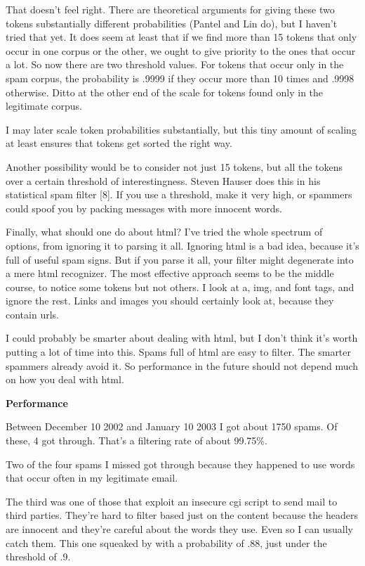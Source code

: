 That doesn't feel right. There are theoretical arguments for giving
these two tokens substantially different probabilities (Pantel and Lin
do), but I haven't tried that yet. It does seem at least that if we find
more than 15 tokens that only occur in one corpus or the other, we ought
to give priority to the ones that occur a lot. So now there are two
threshold values. For tokens that occur only in the spam corpus, the
probability is .9999 if they occur more than 10 times and .9998
otherwise. Ditto at the other end of the scale for tokens found only in
the legitimate corpus.

I may later scale token probabilities substantially, but this tiny
amount of scaling at least ensures that tokens get sorted the right way.

Another possibility would be to consider not just 15 tokens, but all the
tokens over a certain threshold of interestingness. Steven Hauser does
this in his statistical spam filter {[}8{]}. If you use a threshold,
make it very high, or spammers could spoof you by packing messages with
more innocent words.

Finally, what should one do about html? I've tried the whole spectrum of
options, from ignoring it to parsing it all. Ignoring html is a bad
idea, because it's full of useful spam signs. But if you parse it all,
your filter might degenerate into a mere html recognizer. The most
effective approach seems to be the middle course, to notice some tokens
but not others. I look at a, img, and font tags, and ignore the rest.
Links and images you should certainly look at, because they contain
urls.

I could probably be smarter about dealing with html, but I don't think
it's worth putting a lot of time into this. Spams full of html are easy
to filter. The smarter spammers already avoid it. So performance in the
future should not depend much on how you deal with html.

\textbf{Performance}

Between December 10 2002 and January 10 2003 I got about 1750 spams. Of
these, 4 got through. That's a filtering rate of about 99.75\%.

Two of the four spams I missed got through because they happened to use
words that occur often in my legitimate email.

The third was one of those that exploit an insecure cgi script to send
mail to third parties. They're hard to filter based just on the content
because the headers are innocent and they're careful about the words
they use. Even so I can usually catch them. This one squeaked by with a
probability of .88, just under the threshold of .9.

